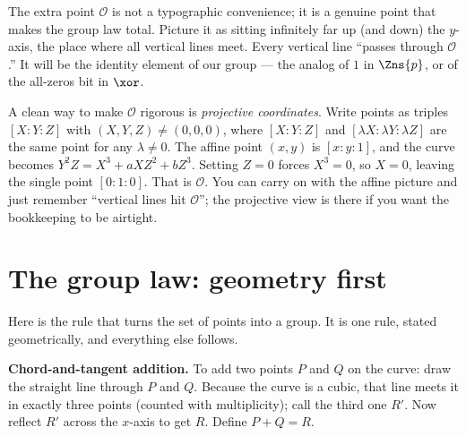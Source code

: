The extra point $\mathcal{O}$ is not a typographic convenience; it is a genuine point
that makes the group law total. Picture it as sitting infinitely far up (and down) the
$y$-axis, the place where all vertical lines meet. Every vertical line ``passes through
$\mathcal{O}$.'' It will be the identity element of our group --- the analog of $1$ in
$\Zns{p}$, or of the all-zeros bit in $\xor$.

\begin{focusbox}
A clean way to make $\mathcal{O}$ rigorous is \emph{projective coordinates}. Write
points as triples $[X:Y:Z]$ with $(X,Y,Z)\ne(0,0,0)$, where $[X:Y:Z]$ and
$[\lambda X:\lambda Y:\lambda Z]$ are the same point for any $\lambda\ne 0$. The affine
point $(x,y)$ is $[x:y:1]$, and the curve becomes $Y^2 Z = X^3 + aXZ^2 + bZ^3$. Setting
$Z=0$ forces $X^3=0$, so $X=0$, leaving the single point $[0:1:0]$. That is
$\mathcal{O}$. You can carry on with the affine picture and just remember ``vertical
lines hit $\mathcal{O}$''; the projective view is there if you want the bookkeeping to
be airtight.
\end{focusbox}

\section{The group law: geometry first}
\label{ch21:grouplaw-geom}

Here is the rule that turns the set of points into a group. It is one rule, stated
geometrically, and everything else follows.

\begin{focusbox}
\textbf{Chord-and-tangent addition.} To add two points $P$ and $Q$ on the curve:
draw the straight line through $P$ and $Q$. Because the curve is a cubic, that line
meets it in exactly three points (counted with multiplicity); call the third one $R'$.
Now reflect $R'$ across the $x$-axis to get $R$. Define $P + Q = R$.
\end{focusbox}

